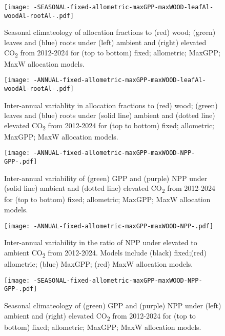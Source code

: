 \graphicspath{{../plots/figs/}}



\begin{figure}[h]
  \centering
    \texttt{[image: -SEASONAL-fixed-allometric-maxGPP-maxWOOD-leafAl-woodAl-rootAl-.pdf]}
    \caption{Seasonal climateology of allocation fractions to (red) wood; (green) leaves and (blue) roots under (left) ambient and (right) elevated CO\textsubscript{2} from 2012-2024 for (top to bottom) fixed; allometric; MaxGPP; MaxW allocation models.}
\end{figure}

\begin{figure}[h!]
  \centering
    \texttt{[image: -ANNUAL-fixed-allometric-maxGPP-maxWOOD-leafAl-woodAl-rootAl-.pdf]}
    \caption{Inter-annual variablity in allocation fractions to (red) wood; (green) leaves and (blue) roots under (solid line) ambient and (dotted line) elevated CO\textsubscript{2} from 2012-2024 for (top to bottom) fixed; allometric; MaxGPP; MaxW allocation models.}
\end{figure}


\begin{figure}[h]
  \centering
    \texttt{[image: -ANNUAL-fixed-allometric-maxGPP-maxWOOD-NPP-GPP-.pdf]}
    \caption{Inter-annual variability of (green) GPP and (purple) NPP under (solid line) ambient and (dotted line) elevated CO\textsubscript{2} from 2012-2024 for (top to bottom) fixed; allometric; MaxGPP; MaxW allocation models.}
\end{figure}

\begin{figure}[h]
  \centering
    \texttt{[image: -ANNUAL-fixed-allometric-maxGPP-maxWOOD-NPP-.pdf]}
    \caption{Inter-annual variability in the ratio of NPP under elevated to ambient CO\textsubscript{2} from 2012-2024. Models include (black) fixed;(red) allometric; (blue) MaxGPP; (red) MaxW allocation models.}
\end{figure}

\begin{figure}[h]
  \centering
    \texttt{[image: -SEASONAL-fixed-allometric-maxGPP-maxWOOD-NPP-GPP-.pdf]}
    \caption{Seasonal climateology of (green) GPP and (purple) NPP under  (left) ambient and (right) elevated CO\textsubscript{2} from 2012-2024 for (top to bottom) fixed; allometric; MaxGPP; MaxW allocation models.}
\end{figure}

